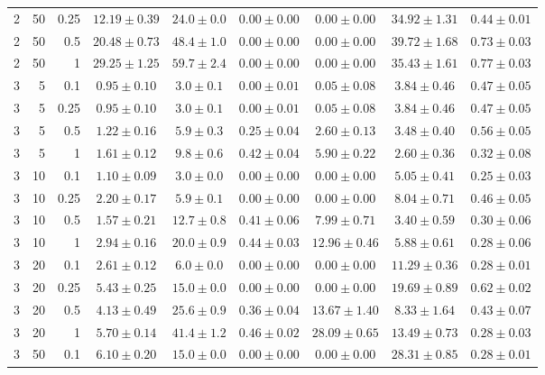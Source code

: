 \begin{table}[htbp]
\begin{tabular}{@{}rrrcccccc@{}}
2 & 50 & 0.25 & $12.19 \pm 0.39$ & $24.0 \pm 0.0$ & $0.00 \pm 0.00$ & $0.00 \pm 0.00$ & $34.92 \pm 1.31$ & $0.44 \pm 0.01$ \\
2 & 50 & 0.5 & $20.48 \pm 0.73$ & $48.4 \pm 1.0$ & $0.00 \pm 0.00$ & $0.00 \pm 0.00$ & $39.72 \pm 1.68$ & $0.73 \pm 0.03$ \\
2 & 50 & 1 & $29.25 \pm 1.25$ & $59.7 \pm 2.4$ & $0.00 \pm 0.00$ & $0.00 \pm 0.00$ & $35.43 \pm 1.61$ & $0.77 \pm 0.03$ \\
\midrule
3 & 5 & 0.1 & $0.95 \pm 0.10$ & $3.0 \pm 0.1$ & $0.00 \pm 0.01$ & $0.05 \pm 0.08$ & $3.84 \pm 0.46$ & $0.47 \pm 0.05$ \\
3 & 5 & 0.25 & $0.95 \pm 0.10$ & $3.0 \pm 0.1$ & $0.00 \pm 0.01$ & $0.05 \pm 0.08$ & $3.84 \pm 0.46$ & $0.47 \pm 0.05$ \\
3 & 5 & 0.5 & $1.22 \pm 0.16$ & $5.9 \pm 0.3$ & $0.25 \pm 0.04$ & $2.60 \pm 0.13$ & $3.48 \pm 0.40$ & $0.56 \pm 0.05$ \\
3 & 5 & 1 & $1.61 \pm 0.12$ & $9.8 \pm 0.6$ & $0.42 \pm 0.04$ & $5.90 \pm 0.22$ & $2.60 \pm 0.36$ & $0.32 \pm 0.08$ \\
3 & 10 & 0.1 & $1.10 \pm 0.09$ & $3.0 \pm 0.0$ & $0.00 \pm 0.00$ & $0.00 \pm 0.00$ & $5.05 \pm 0.41$ & $0.25 \pm 0.03$ \\
3 & 10 & 0.25 & $2.20 \pm 0.17$ & $5.9 \pm 0.1$ & $0.00 \pm 0.00$ & $0.00 \pm 0.00$ & $8.04 \pm 0.71$ & $0.46 \pm 0.05$ \\
3 & 10 & 0.5 & $1.57 \pm 0.21$ & $12.7 \pm 0.8$ & $0.41 \pm 0.06$ & $7.99 \pm 0.71$ & $3.40 \pm 0.59$ & $0.30 \pm 0.06$ \\
3 & 10 & 1 & $2.94 \pm 0.16$ & $20.0 \pm 0.9$ & $0.44 \pm 0.03$ & $12.96 \pm 0.46$ & $5.88 \pm 0.61$ & $0.28 \pm 0.06$ \\
3 & 20 & 0.1 & $2.61 \pm 0.12$ & $6.0 \pm 0.0$ & $0.00 \pm 0.00$ & $0.00 \pm 0.00$ & $11.29 \pm 0.36$ & $0.28 \pm 0.01$ \\
3 & 20 & 0.25 & $5.43 \pm 0.25$ & $15.0 \pm 0.0$ & $0.00 \pm 0.00$ & $0.00 \pm 0.00$ & $19.69 \pm 0.89$ & $0.62 \pm 0.02$ \\
3 & 20 & 0.5 & $4.13 \pm 0.49$ & $25.6 \pm 0.9$ & $0.36 \pm 0.04$ & $13.67 \pm 1.40$ & $8.33 \pm 1.64$ & $0.43 \pm 0.07$ \\
3 & 20 & 1 & $5.70 \pm 0.14$ & $41.4 \pm 1.2$ & $0.46 \pm 0.02$ & $28.09 \pm 0.65$ & $13.49 \pm 0.73$ & $0.28 \pm 0.03$ \\
3 & 50 & 0.1 & $6.10 \pm 0.20$ & $15.0 \pm 0.0$ & $0.00 \pm 0.00$ & $0.00 \pm 0.00$ & $28.31 \pm 0.85$ & $0.28 \pm 0.01$ \\

\end{tabular}
\end{table}

